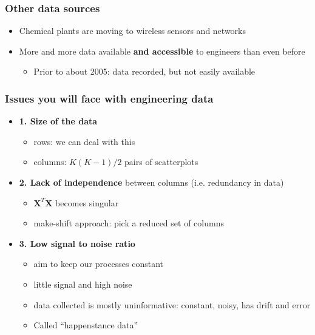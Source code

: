 \begin{frame}\frametitle{Other data sources}
	\begin{itemize}
		\item	Chemical plants are moving to wireless sensors and networks
		\item	More and more data available \textbf{and accessible} to engineers than even before
		\begin{itemize}
			\item	Prior to about 2005: data recorded, but not easily available
		\end{itemize}
	\end{itemize}
\end{frame}

\begin{frame}\frametitle{Issues you will face with engineering data}
	\begin{itemize}
		\item	\textbf{1. Size of the data}
		\begin{itemize}
			\item	rows: we can deal with this
			\item	columns: $K(K-1)/2$ pairs of scatterplots
		\end{itemize}
		\item	\textbf{2. Lack of independence} between columns (i.e. redundancy in data)
		\begin{itemize}
			\item	$\mathbf{X}^T\mathbf{X}$ becomes singular
			\item	make-shift approach: pick a reduced set of columns
		\end{itemize}
		\item	\textbf{3. Low signal to noise ratio}
		\begin{itemize}
			\item	aim to keep our processes constant
			\item	little signal and high noise
			\item	data collected is mostly uninformative: constant, noisy, has drift and error
			\item	Called ``happenstance data''
		\end{itemize}
	\end{itemize}
\end{frame}


